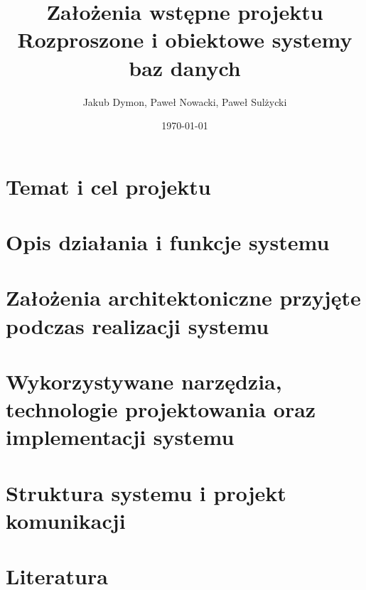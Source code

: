 \documentclass[a4paper,11pt]{article}
\title{
Założenia wstępne projektu\\
\small{Rozproszone i obiektowe systemy baz danych}
}
\author{Jakub Dymon, Paweł Nowacki, Paweł Sulżycki}
\date{\today}
\begin{document}
\maketitle
\section{Temat i cel projektu}
\section{Opis działania i funkcje systemu}
\section{Założenia architektoniczne przyjęte podczas realizacji systemu}
\section{Wykorzystywane narzędzia, technologie projektowania oraz implementacji systemu}
\section{Struktura systemu i projekt komunikacji}
\section{Literatura}
\end{document}
